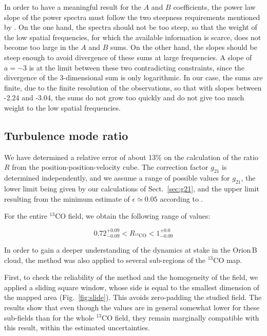 \documentclass[structabstract]{aa}
\newcommand{\emm}[1]{\ensuremath{#1}}
\newcommand{\emr}[1]{\emm{\mathrm{#1}}}
\begin{document}
In order to have a meaningful result for the $A$ and $B$ coefficients, the power law slope of the power spectra must follow the two steepness requirements mentioned by \citet{brunt10}. On the one hand, the spectra should not be too steep, so that the weight of the low spatial frequencies, for which the available information is scarce, does not become too large in the $A$ and $B$ sums. On the other hand, the slopes should be steep enough to avoid divergence of these sums at large frequencies. A slope of $a = -3$ is at the limit between these two contradicting constraints, since the divergence of the 3-dimensional sum is only logarithmic. In our case, the sums are finite, due to the finite resolution of the observations, so that with slopes between -2.24 and -3.04, the sums do not grow too quickly and do not give too much weight to the low spatial frequencies.


\subsection{Turbulence mode ratio}
\label{sec:turb}
We have determined a relative error of about 13\% on the calculation of the ratio $R$ from the position-position-velocity cube. The correction factor $g_{21}$ is determined independently, and we assume a range of possible values for $g_{21}$, the lower limit being given by our calculations of Sect.~\ref{sec:g21}, and the upper limit resulting from the minimum estimate of $\epsilon \simeq 0.05$ according to \citet{brunt14}.

For the entire $^{13}$CO field, we obtain the following range of values:

\begin{equation}
  0.72^{+0.09}_{-0.09}  < R_{^{13}\emr{CO}} <  1^{+0.0}_{-0.09}
\end{equation}

In order to gain a deeper understanding of the dynamics at stake in the Orion\,B cloud, the method was also applied to several sub-regions of the $^{13}$CO map.

First, to check the reliability of the method and the homogeneity of the field, we applied a sliding square window, whose side is equal to the smallest dimension of the mapped area (Fig.~\ref{fig:slide}). This avoids zero-padding the studied field. The results show that even though the values are in general somewhat lower for these sub-fields than for the whole $^{13}$CO field, they remain marginally compatible with this result, within the estimated uncertainties.
\end{document}
